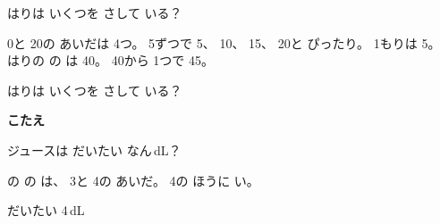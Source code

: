 \begin{reidai}
\noindent\begin{minipage}[c]{0.6\linewidth}
はりは いくつを さして いる？

\kangaekata 0と 20の あいだは 4つ。 5ずつで 5、 10、 15、 20と ぴったり。 \mbox{1もり}は 5。\\
はりの の は 40。 40から 1つで 45。

\end{minipage}\hfill
\begin{minipage}[c]{0.38\linewidth}\centering
{}
\end{minipage}
\end{reidai}

\begin{jibun}
\noindent\begin{minipage}[c]{0.6\linewidth}
はりは いくつを さして いる？\par\vspace{8pt}
\noindent\hfill{\sffamily\bfseries\small\color{bkOrange}こたえ}\enspace\bkkakikomi[16mm]
\end{minipage}\hfill
\begin{minipage}[c]{0.38\linewidth}\centering
{}
\end{minipage}
\end{jibun}

\begin{reidai}
\noindent\begin{minipage}[c]{0.7\linewidth}
ジュースは だいたい なん\,dL？

\kangaekata {}の の は、 3と 4の あいだ。 4の ほうに い。

\kotae だいたい 4\,dL
\end{minipage}\hfill
\begin{minipage}[c]{0.28\linewidth}\centering
{}
\end{minipage}
\end{reidai}

